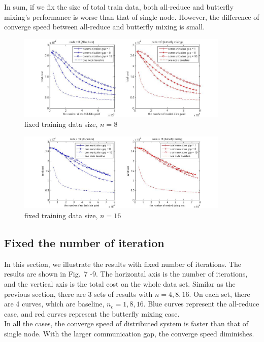 \documentclass{article}
\begin{document}
In sum, if we fix the size of total train data, both all-reduce and butterfly mixing's performance is worse than that of single node. However, the difference of converge speed between all-reduce and butterfly mixing is small.
\begin{figure}
  
  \centering
    \includegraphics[width=0.9\textwidth]{batch20_node8_fixData.jpg}
    \caption{fixed training data size, $n=8$}
\end{figure}
\begin{figure}
  
  \centering
    \includegraphics[width=0.9\textwidth]{batch20_node16_fixData.jpg}
    \caption{fixed training data size, $n=16$}
\end{figure}


\subsection{Fixed the number of iteration}

In this section, we illustrate the results with fixed number of iterations. The results are shown in Fig.~7 -9. The horizontal axis is the number of iterations, and the vertical axis is the total cost on the whole data set. Similar as the previous section, there are 3 sets of results with $n = 4, 8, 16$. On each set, there are 4 curves, which are baseline, $n_c = 1, 8, 16$. Blue curves represent the all-reduce case, and red curves represent the butterfly mixing case. \\

In all the cases, the converge speed of distributed system is faster than that of single node. With the larger communication gap, the converge speed diminishes. \\
\end{document}
